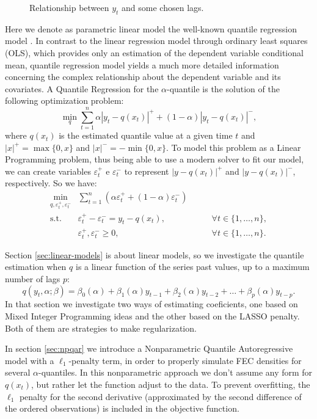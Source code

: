 \begin{figure}
\begin{minipage}[t]{0.45\linewidth}
\begin{minipage}[b]{\linewidth}
    \end{minipage}
  \end{minipage}
  \caption{Relationship between $y_t$ and some chosen lags.}
  \label{lags-icaraizinho}
\end{figure}

Here we denote as parametric linear model the well-known quantile regression model \cite{koenker2005quantile}. In contrast to the linear regression model through ordinary least squares (OLS), which provides only an estimation of the dependent variable conditional mean, quantile regression model yields a much more detailed information concerning the complex relationship about the dependent variable and its covariates. A Quantile Regression for the $\alpha$-quantile is the solution of the following optimization problem:
\begin{equation}
\min_{q}\sum_{t=1}^{n}\alpha|y_{t}-q(x_t)|^{+}+(1-\alpha)|y_{t}-q(x_t)|^{-},
\label{eq:linear-model}
\end{equation}
where $q(x_t)$ is the estimated quantile value at a given time $t$ and $|x|^+=\max\{0,x\}$ and $|x|^-=-\min\{0,x\}$. To model this problem as a Linear Programming problem, thus being able to use a modern solver to fit our model,  we can create variables $\varepsilon^+_t$ e $\varepsilon^-_t$ to represent $|y-q(x_t)|^+$ and $|y-q(x_t)|^-$, respectively. So we have:
\begin{equation}
\begin{aligned}\min_{q,\varepsilon_{t}^{+}, \varepsilon_{t}^{-}} & \sum_{t=1}^{n}\left(\alpha \varepsilon_{t}^{+}+(1-\alpha)\varepsilon_{t}^{-}\right) & \\
\mbox{s.t. } & \varepsilon_{t}^{+}-\varepsilon_{t}^{-}=y_{t}-q(x_{t}), & \qquad\forall t \in \{1,\dots,n\},\\
& \varepsilon_t^+,\varepsilon_t^- \geq 0, & \qquad \forall t \in \{1,\dots,n\}.
\end{aligned}
\label{eq:qar-general}
\end{equation}

Section \ref{sec:linear-models} is about linear models, so we investigate the quantile estimation when $q$ is a linear function of the series past values, up to a maximum number of lags $p$:
\begin{equation}
	q(y_t, \alpha; \beta) = \beta_0(\alpha) + \beta_1(\alpha)y_{t-1} + \beta_2(\alpha)y_{t-2} + \dots + \beta_p(\alpha) y_{t-p}.
	\label{eq:ft-qar}
\end{equation}
In that section we investigate two ways of estimating coeficients, one based on Mixed Integer Programming ideas and the other based on the LASSO \cite{tibshirani1996regression} penalty. Both of them are strategies to make regularization.

In section \ref{sec:npqar} we introduce a Nonparametric Quantile Autoregressive model with a $\ell_{1}$-penalty term, in order to properly simulate FEC densities for several $\alpha$-quantiles. In this nonparametric approach we don't assume any form for $q(x_t)$, but rather let the function adjust to the data. To prevent overfitting, the $\ell_1$ penalty for the second derivative (approximated by the second difference of the ordered observations) is included in the objective function.